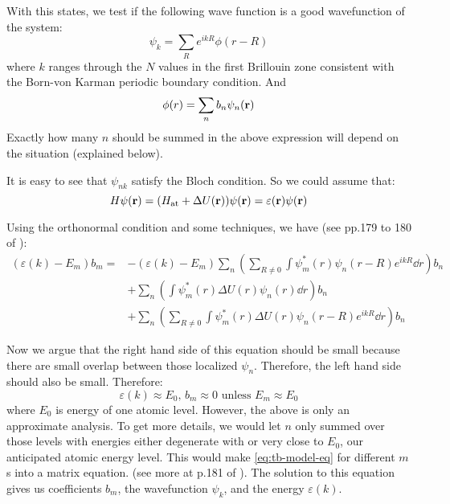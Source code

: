 \documentclass{article}
\begin{document}
With this states, we test if the following wave function is a good
wavefunction of the system:
\begin{equation}
    \psi_{k} = \sum_R e^{ikR} \phi(r-R)
\end{equation}
where $k$ ranges through the $N$ values in the first Brillouin zone
consistent with the Born-von Karman periodic boundary condition. And
\begin{equation}
    \phi(r) = \sum_n b_n \psi_n(\vb{r})
\end{equation}
Exactly how many $n$ should be summed in the above expression will
depend on the situation (explained below).

It is easy to see that $\psi_{nk}$ satisfy the Bloch condition. So we
could assume that:
\begin{equation}
    H \psi(\vb{r}) = (H_\text{at}+\Delta U(\vb{r}))\psi(\vb{r})
    = \varepsilon(\vb{r})\psi(\vb{r})
\end{equation}

Using the orthonormal condition and some techniques, we have (see
pp.179 to 180 of \cite{Ashcroft1976}):
\begin{align}
    \label{eq:tb-model-eq}
    (\varepsilon(k) - E_m) b_m = & 
    -(\varepsilon(k)-E_m)\sum_n\left(
        \sum_{R\neq 0}\int\psi^*_m(r)\psi_n(r-R)e^{ikR}\dd{r}\right)b_n
    \nonumber\\
    &+ \sum_n \left(\int\psi^*_m(r)\Delta U(r)\psi_n(r)\dd{r}\right) b_n
    \nonumber\\
    &+ \sum_n\left(\sum_{R\neq 0}
        \int\psi^*_m(r)\Delta U(r)\psi_n(r-R)e^{ikR}\dd{r}\right)b_n
\end{align}

Now we argue that the right hand side of this equation should be small
because there are small overlap between those localized $\psi_n$.
Therefore, the left hand side should also be small. Therefore:
\begin{equation}
    \varepsilon(k) \approx E_0,\, b_m\approx 0\text{ unless } E_m\approx E_0
\end{equation}
where $E_0$ is energy of one atomic level. However, the above is only
an approximate analysis. To get more details, we would let $n$ only
summed over those levels with energies either degenerate with or very
close to $E_0$, our anticipated atomic energy level. This would make
\ref{eq:tb-model-eq} for different $m$s into a matrix equation. (see
more at p.181 of \cite{Ashcroft1976}). The solution to this equation
gives us coefficients $b_m$, the wavefunction $\psi_k$, and the energy
$\varepsilon(k)$.
\end{document}
